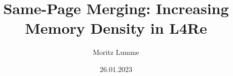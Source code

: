 \title[SPMM in L4Re]{Same-Page Merging: Increasing Memory Density in L4Re}
\author{Moritz Lumme}
\institute[TU Dresden]{}
\date{26.01.2023}

\begin{frame}
  \titlepage
\end{frame}
